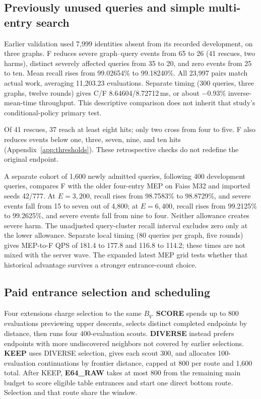 

\subsection{Previously unused queries and simple multi-entry search}\label{sec:newqueries}
Earlier validation used 7,999 identities absent from its recorded development, on three graphs. F reduces severe graph--query events from 65 to 26 (41 rescues, two harms), distinct severely affected queries from 35 to 20, and zero events from 25 to ten. Mean recall rises from 99.02654\% to 99.18240\%. All 23,997 pairs match actual work, averaging 11,203.23 evaluations. Separate timing (300 queries, three graphs, twelve rounds) gives C/F 8.64604/8.72712\,ms, or about $-0.93\%$ inverse-mean-time throughput. This descriptive comparison does not inherit that study's conditional-policy primary test.

Of 41 rescues, 37 reach at least eight hits; only two cross from four to five. F also reduces events below one, three, seven, nine, and ten hits (Appendix~\ref{app:thresholds}). These retrospective checks do not redefine the original endpoint.

A separate cohort of 1,600 newly admitted queries, following 400 development queries, compares F with the older four-entry MEP on Faiss M32 and imported seeds 42/777. At $E=3{,}200$, recall rises from 98.7583\% to 98.8729\%, and severe events fall from 15 to seven out of 4,800; at $E=6{,}400$, recall rises from 99.2125\% to 99.2625\%, and severe events fall from nine to four. Neither allowance creates severe harm. The unadjusted query-cluster recall interval excludes zero only at the lower allowance. Separate local timing (80 queries per graph, five rounds) gives MEP-to-F QPS of 181.4 to 177.8 and 116.8 to 114.2; these times are not mixed with the server wave. The expanded latest MEP grid tests whether that historical advantage survives a stronger entrance-count choice.

\subsection{Paid entrance selection and scheduling}\label{sec:family}
Four extensions charge selection to the same $B_q$. \textbf{SCORE} spends up to 800 evaluations previewing upper descents, selects distinct completed endpoints by distance, then runs four 400-evaluation scouts. \textbf{DIVERSE} instead prefers endpoints with more undiscovered neighbors not covered by earlier selections. \textbf{KEEP} uses DIVERSE selection, gives each scout 300, and allocates 100-evaluation continuations by frontier distance, capped at 800 per route and 1,600 total. After KEEP, \textbf{E64\_RAW} takes at most 800 from the remaining main budget to score eligible table entrances and start one direct bottom route. Selection and that route share the window.

